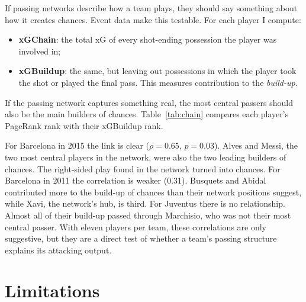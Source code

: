 \documentclass[11pt,a4paper]{article}
\begin{document}
If passing networks describe how a team plays, they should say something about how it creates chances. Event data make this testable. For each player I compute:
\begin{itemize}
\item \textbf{xGChain}: the total xG of every shot-ending possession the player was involved in;
\item \textbf{xGBuildup}: the same, but leaving out possessions in which the player took the shot or played the final pass. This measures contribution to the \emph{build-up}.
\end{itemize}
If the passing network captures something real, the most central passers should also be the main builders of chances. Table~\ref{tab:chain} compares each player's PageRank rank with their xGBuildup rank.



For Barcelona in 2015 the link is clear ($\rho = 0.65$, $p = 0.03$). Alves and Messi, the two most central players in the network, were also the two leading builders of chances. The right-sided play found in the network turned into chances. For Barcelona in 2011 the correlation is weaker (0.31). Busquets and Abidal contributed more to the build-up of chances than their network positions suggest, while Xavi, the network's hub, is third. For Juventus there is no relationship. Almost all of their build-up passed through Marchisio, who was not their most central passer. With eleven players per team, these correlations are only suggestive, but they are a direct test of whether a team's passing structure explains its attacking output.

\section{Limitations}\label{sec:limitations}
\end{document}
